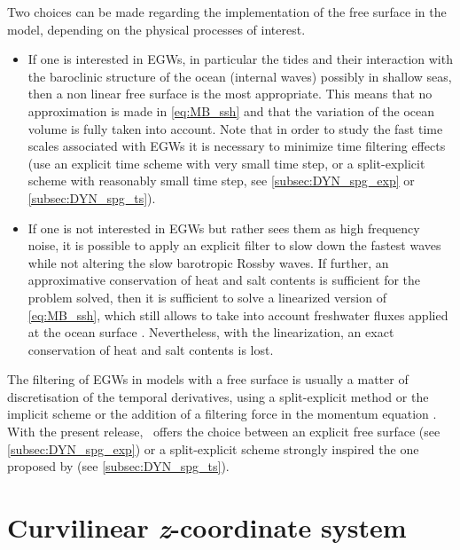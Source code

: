 \documentclass[../main/NEMO_manual]{subfiles}
\begin{document}
Two choices can be made regarding the implementation of the free surface in the model,
depending on the physical processes of interest.
\begin{itemize}
\item If one is interested in EGWs, in particular the tides and their interaction with
  the baroclinic structure of the ocean (internal waves) possibly in shallow seas,
  then a non linear free surface is the most appropriate.
  This means that no approximation is made in \autoref{eq:MB_ssh} and that
  the variation of the ocean volume is fully taken into account.
  Note that in order to study the fast time scales associated with EGWs it is necessary to
  minimize time filtering effects
  (use an explicit time scheme with very small time step,
  or a split-explicit scheme with reasonably small time step,
  see \autoref{subsec:DYN_spg_exp} or \autoref{subsec:DYN_spg_ts}).
\item If one is not interested in EGWs but rather sees them as high frequency noise,
  it is possible to apply an explicit filter to slow down the fastest waves while
  not altering the slow barotropic Rossby waves.
  If further, an approximative conservation of heat and salt contents is sufficient for
  the problem solved, then it is sufficient to solve a linearized version of \autoref{eq:MB_ssh},
  which still allows to take into account freshwater fluxes applied at the ocean surface
  \citep{roullet.madec_JGR00}.
  Nevertheless, with the linearization, an exact conservation of heat and salt contents is lost.
\end{itemize}
The filtering of EGWs in models with a free surface is usually
a matter of discretisation of the temporal derivatives,
using a split-explicit method \citep{killworth.webb.ea_JPO91, zhang.endoh_JGR92} or
the implicit scheme \citep{dukowicz.smith_JGR94} or the addition of a filtering force in
the momentum equation \citep{roullet.madec_JGR00}.
With the present release, \NEMO\ offers the choice between an explicit free surface
(see \autoref{subsec:DYN_spg_exp}) or a split-explicit scheme strongly inspired the one proposed by
\citet{shchepetkin.mcwilliams_OM05} (see \autoref{subsec:DYN_spg_ts}).

\section{Curvilinear \textit{z}-coordinate system}
\label{sec:MB_zco}
\end{document}
